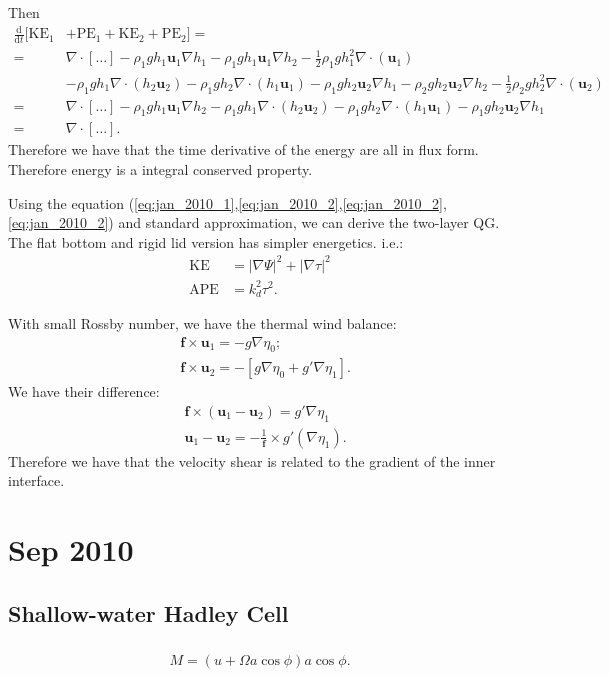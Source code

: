 \documentclass[11pt,letterpaper]{book}
\theoremstyle{definition}
\newcommand{\de}{\mathrm{d}}
\newcommand{\ve}[1]{\boldsymbol{#1}}
\newcommand{\APE}{\text{APE}}
\newcommand{\KE}{\text{KE}}
\begin{document}
Then
\begin{align*}
\frac{\de}{\de t}[\text{KE}_1&+\text{PE}_1+\text{KE}_2+\text{PE}_2] = \\
=& \nabla\cdot[\dots]-\rho_1gh_1\ve u_1\nabla h_1-\rho_1gh_1\ve u_1\nabla h_2-\frac{1}{2}\rho_1 g h_1^2\nabla\cdot(\ve u_1)\\
&-\rho_1 gh_1\nabla\cdot(h_2\ve u_2)-\rho_1 gh_2\nabla\cdot(h_1\ve u_1)-\rho_1gh_2\ve u_2\nabla h_1-\rho_2gh_2\ve u_2\nabla h_2-\frac{1}{2}\rho_2 g h_2^2\nabla\cdot(\ve u_2)\\
=& \nabla\cdot[\dots]-\rho_1gh_1\ve u_1\nabla h_2-\rho_1 gh_1\nabla\cdot(h_2\ve u_2)-\rho_1 gh_2\nabla\cdot(h_1\ve u_1)-\rho_1gh_2\ve u_2\nabla h_1\\
=& \nabla\cdot[\dots].
\end{align*}
Therefore we have that the time derivative of the energy are all in flux form. Therefore energy is a integral conserved property.

Using the equation (\ref{eq:jan_2010_1},\ref{eq:jan_2010_2},\ref{eq:jan_2010_2},\ref{eq:jan_2010_2}) and standard approximation, we can derive the two-layer QG. The flat bottom and rigid lid version has simpler energetics. i.e.:
\begin{align*}
\KE &= |\nabla \Psi|^2+|\nabla \tau|^2\\
\APE &= k_d^2\tau^2.
\end{align*}

With small Rossby number, we have the thermal wind balance:
\begin{align*}
&\ve f\times \ve u_1 = -g\nabla \eta_0 ;\\
&\ve f\times \ve u_2 = -[ g \nabla \eta_0+g' \nabla \eta_1] .
\end{align*}
We have their difference:
\begin{align*}
&\ve f\times (\ve u_1-\ve u_2) = g' \nabla \eta_1\\
&\ve u_1-\ve u_2 = -\frac{1}{\ve f}\times g'(\nabla\eta_1).
\end{align*}
Therefore we have that the velocity shear is related to the gradient of the inner interface.


\chapter{Sep 2010}
\section{Shallow-water Hadley Cell}
\subsection{}
\begin{align*}
M = (u+\Omega a\cos\phi)a\cos\phi.
\end{align*}
\end{document}
